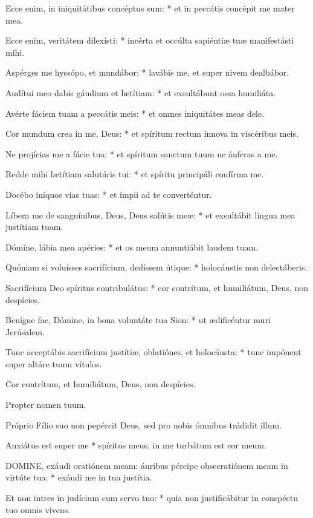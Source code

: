 Ecce enim, in iniquitátibus concéptus sum: * et in peccátis concépit me mater mea.

Ecce enim, veritátem dilexísti: * incérta et occúlta sapiéntiæ tuæ manifestásti mihi.

Aspérges me hyssópo, et mundábor: * lavábis me, et super nivem dealbábor.

Audítui meo dabis gáudium et lætítiam: * et exsultábunt ossa humiliáta.

Avérte fáciem tuam a peccátis meis: * et omnes iniquitátes meas dele.

Cor mundum crea in me, Deus: * et spíritum rectum ínnova in viscéribus meis.

Ne projícias me a fácie tua: * et spíritum sanctum tuum ne áuferas a me.

Redde mihi lætítiam salutáris tui: * et spíritu principáli confírma me.

Docébo iníquos vias tuas: * et ímpii ad te converténtur.

Líbera me de sanguínibus, Deus, Deus salútis meæ: * et exsultábit lingua mea justítiam tuam.

Dómine, lábia mea apéries: * et os meum annuntiábit laudem tuam.

Quóniam si voluísses sacrifícium, dedíssem útique: * holocáustis non delectáberis.

Sacrifícium Deo spíritus contribulátus: * cor contrítum, et humiliátum, Deus, non despícies.

Benígne fac, Dómine, in bona voluntáte tua Sion: * ut ædificéntur muri Jerúsalem.

Tunc acceptábis sacrifícium justítiæ, oblatiónes, et holocáusta: * tunc impónent super altáre tuum vítulos.

 Cor contrítum, et humiliátum, Deus, non despícies.

 Propter nomen tuum.


 Próprio Fílio suo non pepércit Deus, sed pro nobis ómnibus trádidit illum.

 Anxiátus est super me * spíritus meus, in me turbátum est cor meum.


\lettrine[lines=2]{D}{OMINE}, exáudi oratiónem meam: áuribus pércipe obsecratiónem meam in virtúte tua: * exáudi me in tua justítia.

Et non intres in judícium cum servo tuo: * quia non justificábitur in conspéctu tuo omnis vivens.

